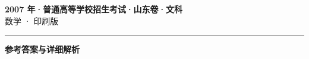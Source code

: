 \documentclass[zihao=5, a4paper]{ctexart}
\begin{document}
\begin{center}
  {\Large\bfseries 2007 年·普通高等学校招生考试·山东卷·文科}\\[4pt]
  {\large 数学 · 印刷版}
\end{center}
\medskip
{}

\par\bigskip\hrule\bigskip
{}
\begin{center}{\large\bfseries 参考答案与详细解析}\end{center}
\smallskip

\end{document}
